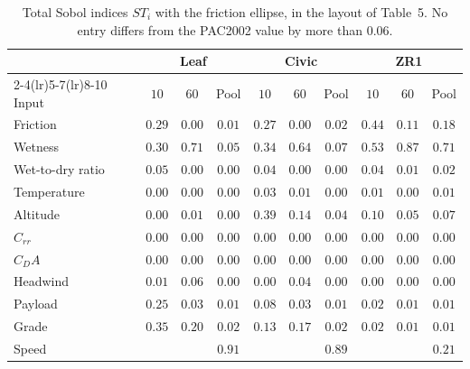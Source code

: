 \documentclass[12pt, twoside]{amsart}
\theoremstyle{definition}
\newcommand{\mainref}[2]{#2}
\begin{document}
\begin{table}[htbp]
\centering\small
\setlength{\tabcolsep}{4.2pt}
\caption{Total Sobol indices $ST_i$ with the friction ellipse, in the layout of Table~\mainref{tab:sobol}{5}. No entry differs from the PAC2002 value by more than $0.06$.}\label{tab:app-sobol-ellipse}
\begin{tabular}{lccccccccc}
\toprule
& \multicolumn{3}{c}{Leaf} & \multicolumn{3}{c}{Civic} & \multicolumn{3}{c}{ZR1}\\
\cmidrule(lr){2-4}\cmidrule(lr){5-7}\cmidrule(lr){8-10}
Input & $10$ & $60$ & Pool & $10$ & $60$ & Pool & $10$ & $60$ & Pool\\
\midrule
Friction & $0.29$ & $0.00$ & $0.01$ & $0.27$ & $0.00$ & $0.02$ & $0.44$ & $0.11$ & $0.18$\\
Wetness & $0.30$ & $0.71$ & $0.05$ & $0.34$ & $0.64$ & $0.07$ & $0.53$ & $0.87$ & $0.71$\\
Wet-to-dry ratio & $0.05$ & $0.00$ & $0.00$ & $0.04$ & $0.00$ & $0.00$ & $0.04$ & $0.01$ & $0.02$\\
Temperature & $0.00$ & $0.00$ & $0.00$ & $0.03$ & $0.01$ & $0.00$ & $0.01$ & $0.00$ & $0.01$\\
Altitude & $0.00$ & $0.01$ & $0.00$ & $0.39$ & $0.14$ & $0.04$ & $0.10$ & $0.05$ & $0.07$\\
$C_{rr}$ & $0.00$ & $0.00$ & $0.00$ & $0.00$ & $0.00$ & $0.00$ & $0.00$ & $0.00$ & $0.00$\\
$C_DA$ & $0.00$ & $0.00$ & $0.00$ & $0.00$ & $0.00$ & $0.00$ & $0.00$ & $0.00$ & $0.00$\\
Headwind & $0.01$ & $0.06$ & $0.00$ & $0.00$ & $0.04$ & $0.00$ & $0.00$ & $0.00$ & $0.00$\\
Payload & $0.25$ & $0.03$ & $0.01$ & $0.08$ & $0.03$ & $0.01$ & $0.02$ & $0.01$ & $0.01$\\
Grade & $0.35$ & $0.20$ & $0.02$ & $0.13$ & $0.17$ & $0.02$ & $0.02$ & $0.01$ & $0.01$\\
\midrule
Speed &  &  & $0.91$ &  &  & $0.89$ &  &  & $0.21$\\
\bottomrule
\end{tabular}
\end{table}
\end{document}
